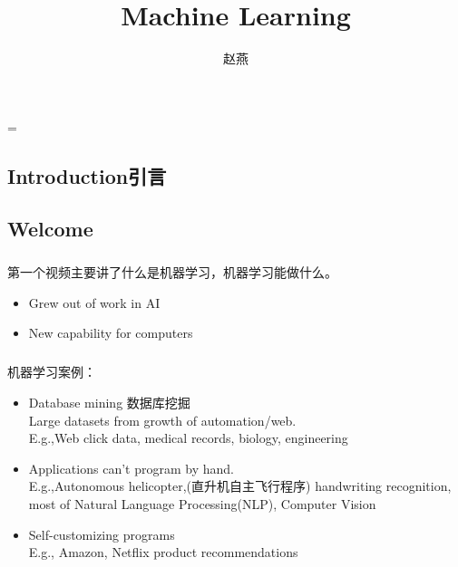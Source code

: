 \documentclass{article}
\begin{document}
 
\hfuzz=\maxdimen
{}
\begin{CJK}{UTF8}{gbsn}  
\title{\heiti Machine Learning}
\author{赵燕}
\date{}
\newpage
\section{Introduction引言}
\subsection{Welcome}
\subparagraph*{}
 第一个视频主要讲了什么是机器学习，机器学习能做什么。
\begin{itemize}
  \item Grew out of work in AI
  \item New capability for computers
\end{itemize}
\subparagraph*{}
 机器学习案例：
\begin{itemize}
  \item Database mining 数据库挖掘\\
   Large datasets from growth of automation/web.\\
   E.g.,Web click data, medical records, biology, engineering
  \item Applications can't program by hand.\\
   E.g.,Autonomous helicopter,(直升机自主飞行程序) handwriting recognition, most of Natural Language Processing(NLP), Computer Vision
  \item Self-customizing programs\\
   E.g., Amazon, Netflix product recommendations
\end{itemize}

\end{CJK}
\end{document}
